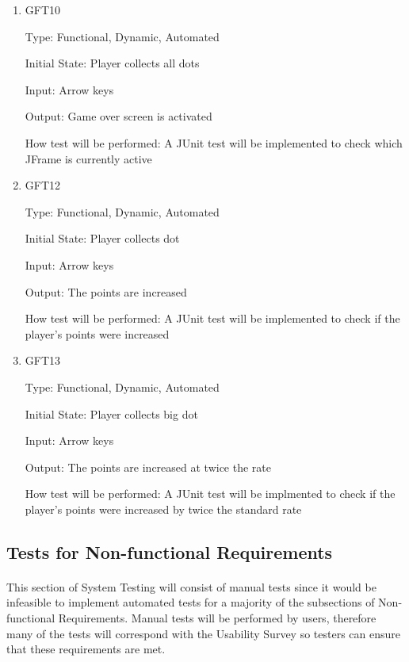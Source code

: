 \documentclass[12pt, titlepage]{article}
\begin{document}
\begin{enumerate}

\item{GFT10\\}

Type: Functional, Dynamic, Automated
					
Initial State: Player collects all dots
					
Input: Arrow keys
					
Output: Game over screen is activated

How test will be performed: A JUnit test will be implemented to check which JFrame is currently active

\item{GFT12\\}

Type: Functional, Dynamic, Automated
					
Initial State: Player collects dot
					
Input: Arrow keys
					
Output: The points are increased

How test will be performed: A JUnit test will be implemented to check if the player's points were increased

\item{GFT13\\}

Type: Functional, Dynamic, Automated
					
Initial State: Player collects big dot
					
Input: Arrow keys
					
Output: The points are increased at twice the rate

How test will be performed: A JUnit test will be implmented to check if the player's points were increased by twice the standard rate

\end{enumerate}

\subsection{Tests for Non-functional Requirements}

\paragraph{}
This section of System Testing will consist of manual tests since it would be infeasible to implement automated tests for a majority of the subsections of Non-functional Requirements. Manual tests will be performed by users, therefore many of the tests will correspond with the Usability Survey so testers can ensure that these requirements are met.
\end{document}
